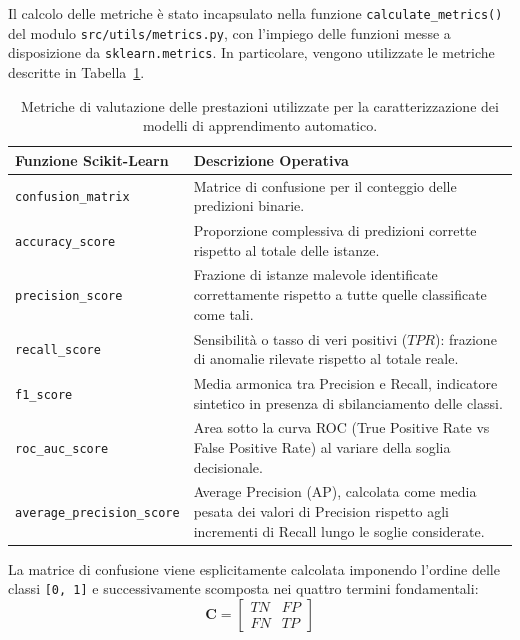 Il calcolo delle metriche è stato incapsulato nella funzione \texttt{calculate\_metrics()} del modulo \texttt{src/utils/metrics.py}, con l'impiego delle funzioni messe a disposizione da \texttt{sklearn.metrics}. 
In particolare, vengono utilizzate le metriche descritte in Tabella~\ref{tab:evaluation_metrics}.

\begin{table}[H]
    \centering
    \small
    \caption{Metriche di valutazione delle prestazioni utilizzate per la caratterizzazione dei modelli di apprendimento automatico.}
    \label{tab:evaluation_metrics}
    \begin{tabularx}{\textwidth}{l >{\raggedright\arraybackslash}X}
        \toprule
        \textbf{Funzione Scikit-Learn} & \textbf{Descrizione Operativa} \\
        \midrule
        \texttt{confusion\_matrix} & Matrice di confusione per il conteggio delle predizioni binarie. \\
        \texttt{accuracy\_score} & Proporzione complessiva di predizioni corrette rispetto al totale delle istanze. \\
        \texttt{precision\_score} & Frazione di istanze malevole identificate correttamente rispetto a tutte quelle classificate come tali. \\
        \texttt{recall\_score} & Sensibilità o tasso di veri positivi ($TPR$): frazione di anomalie rilevate rispetto al totale reale. \\
        \texttt{f1\_score} & Media armonica tra Precision e Recall, indicatore sintetico in presenza di sbilanciamento delle classi. \\
        \texttt{roc\_auc\_score} & Area sotto la curva ROC (True Positive Rate vs False Positive Rate) al variare della soglia decisionale. \\
        \texttt{average\_precision\_score} & Average Precision (AP), calcolata come media pesata dei valori di Precision rispetto agli incrementi di Recall lungo le soglie considerate. \\
        \bottomrule
    \end{tabularx}
\end{table}

La matrice di confusione viene esplicitamente calcolata imponendo l'ordine delle classi \texttt{[0, 1]} e successivamente scomposta nei quattro termini fondamentali:
\begin{equation}
\mathbf{C} =
\begin{bmatrix}
TN & FP \\
FN & TP
\end{bmatrix}
\label{eq:confusion_matrix_implementation}
\end{equation}

